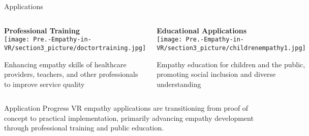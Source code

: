 \documentclass[aspectratio=169,xcolor=dvipsnames]{beamer}
\begin{document}
\begin{frame}{Applications}
    \begin{columns}[c]    
        \begin{center}
            \textbf{\large Professional Training} \\
            \vspace{0.1cm}
            \texttt{[image: Pre.-Empathy-in-VR/section3\_picture/doctortraining.jpg]} \\
            \vspace{0.1cm}
            \begin{minipage}{0.95\textwidth}
                \centering\small
                Enhancing empathy skills of healthcare providers, teachers, and other professionals to improve service quality
            \end{minipage}
        \end{center}
        
        \begin{center}
            \textbf{\large Educational Applications} \\
            \vspace{0.1cm}
            \texttt{[image: Pre.-Empathy-in-VR/section3\_picture/childrenempathy1.jpg]} \\
            \vspace{0.1cm}
            \begin{minipage}{0.95\textwidth}
                \centering\small
                Empathy education for children and the public, promoting social inclusion and diverse understanding
            \end{minipage}
        \end{center}
    \end{columns}
    
    \begin{block}{Application Progress}
        VR empathy applications are transitioning from proof of concept to practical implementation, primarily advancing empathy development through professional training and public education.
\end{block}
\end{frame}
\end{document}
